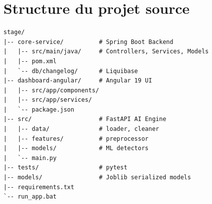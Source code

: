 \section{Structure du projet source}

\begin{lstlisting}[caption={Arborescence du projet Droppy}, label={lst:structure}]
stage/
|-- core-service/          # Spring Boot Backend
|   |-- src/main/java/     # Controllers, Services, Models
|   |-- pom.xml
|   `-- db/changelog/      # Liquibase
|-- dashboard-angular/     # Angular 19 UI
|   |-- src/app/components/
|   |-- src/app/services/
|   `-- package.json
|-- src/                   # FastAPI AI Engine
|   |-- data/              # loader, cleaner
|   |-- features/          # preprocessor
|   |-- models/            # ML detectors
|   `-- main.py
|-- tests/                 # pytest
|-- models/                # Joblib serialized models
|-- requirements.txt
`-- run_app.bat
\end{lstlisting}

